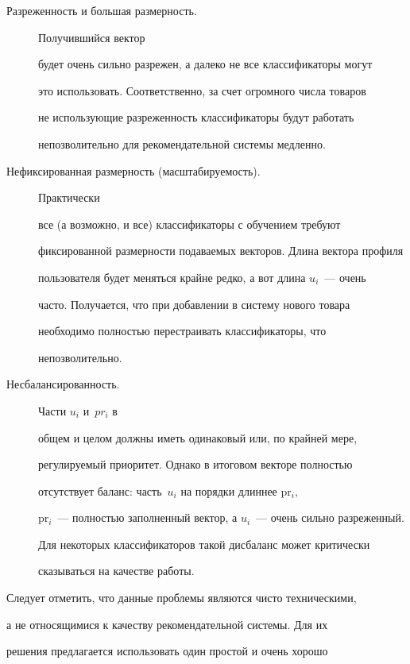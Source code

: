 \begin{description} %


\item[Разреженность и большая размерность.] Получившийся вектор


будет очень сильно разрежен, а далеко не все классификаторы могут


это использовать. Соответственно, за счет огромного числа товаров


не использующие разреженность классификаторы будут работать


непозволительно для рекомендательной системы медленно.


\item[Нефиксированная размерность (масштабируемость).] Практически


все (а возможно, и все) классификаторы с обучением требуют


фиксированной размерности подаваемых векторов. Длина вектора профиля


пользователя будет меняться крайне редко, а вот длина $u_i$~--- очень


часто. Получается, что при добавлении в систему нового товара


необходимо полностью перестраивать классификаторы, что


непозволительно. 


\item[Несбалансированность.] Части $u_i$ и~$pr_i$ в


общем и целом должны иметь одинаковый или, по крайней мере,


регулируемый приоритет. Однако в итоговом векторе полностью


отсутствует баланс: часть~$u_i$ на порядки длиннее pr$_i,$ 


pr$_i$~--- полностью заполненный вектор, а $u_i$~--- очень сильно разреженный.


Для некоторых классификаторов такой дисбаланс может критически


сказываться на качестве работы. \end{description}





Следует отметить, что данные проблемы являются чисто техническими,


а не относящимися к качеству рекомендательной системы. Для их


решения предлагается использовать один простой и очень хорошо


